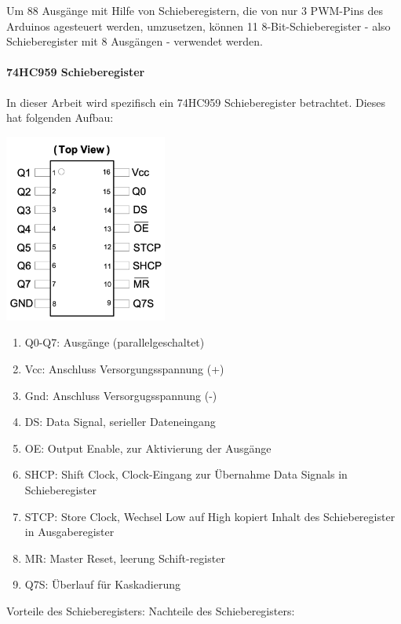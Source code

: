 \begin{enumerate}
Um 88 Ausgänge mit Hilfe von Schieberegistern, die von nur 3 \ac{PWM}-Pins des Arduinos agesteuert werden, umzusetzen,
können 11 8-Bit-Schieberegister  - also Schieberegister mit 8 Ausgängen - verwendet werden.
\paragraph{74HC959 Schieberegister}
In dieser Arbeit wird spezifisch ein 74HC959 Schieberegister betrachtet. Dieses hat folgenden Aufbau:
\begin{minipage}{0.4\textwidth}
	\includegraphics [width=0.4\textwidth] {img/Schieberegister}
\end{minipage}
\begin{minipage}{0.6\textwidth}
	\begin{enumerate}
		\item Q0-Q7: Ausgänge (parallelgeschaltet)
		\item Vcc: Anschluss Versorgungsspannung (+)
		\item Gnd: Anschluss Versorgugsspannung (-)
		\item DS: Data Signal, serieller Dateneingang
		\item OE: Output Enable, zur Aktivierung der Ausgänge
		\item SHCP: Shift Clock, Clock-Eingang zur Übernahme Data Signals in Schieberegister
		\item STCP: Store Clock, Wechsel Low auf High kopiert Inhalt des Schieberegister in Ausgaberegister
		\item MR: Master Reset, leerung Schift-register
		\item Q7S: Überlauf für Kaskadierung
	\end{enumerate}
\end{minipage}

Vorteile des Schieberegisters:\newline
Nachteile des Schieberegisters:

\end{enumerate}

